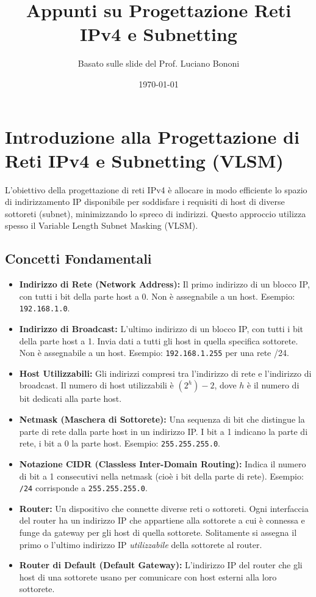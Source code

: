 \documentclass{article}
\title{Appunti su Progettazione Reti IPv4 e Subnetting}
\author{Basato sulle slide del Prof. Luciano Bononi}
\date{\today}
\begin{document}
\maketitle
\tableofcontents
\newpage

\section{Introduzione alla Progettazione di Reti IPv4 e Subnetting (VLSM)}
L'obiettivo della progettazione di reti IPv4 è allocare in modo efficiente lo spazio di indirizzamento IP disponibile per soddisfare i requisiti di host di diverse sottoreti (subnet), minimizzando lo spreco di indirizzi. Questo approccio utilizza spesso il Variable Length Subnet Masking (VLSM).

\subsection{Concetti Fondamentali}
\begin{itemize}
    \item \textbf{Indirizzo di Rete (Network Address):} Il primo indirizzo di un blocco IP, con tutti i bit della parte host a 0. Non è assegnabile a un host. Esempio: \texttt{192.168.1.0}.
    \item \textbf{Indirizzo di Broadcast:} L'ultimo indirizzo di un blocco IP, con tutti i bit della parte host a 1. Invia dati a tutti gli host in quella specifica sottorete. Non è assegnabile a un host. Esempio: \texttt{192.168.1.255} per una rete /24.
    \item \textbf{Host Utilizzabili:} Gli indirizzi compresi tra l'indirizzo di rete e l'indirizzo di broadcast. Il numero di host utilizzabili è $(2^h) - 2$, dove $h$ è il numero di bit dedicati alla parte host.
    \item \textbf{Netmask (Maschera di Sottorete):} Una sequenza di bit che distingue la parte di rete dalla parte host in un indirizzo IP. I bit a 1 indicano la parte di rete, i bit a 0 la parte host. Esempio: \texttt{255.255.255.0}.
    \item \textbf{Notazione CIDR (Classless Inter-Domain Routing):} Indica il numero di bit a 1 consecutivi nella netmask (cioè i bit della parte di rete). Esempio: \texttt{/24} corrisponde a \texttt{255.255.255.0}.
    \item \textbf{Router:} Un dispositivo che connette diverse reti o sottoreti. Ogni interfaccia del router ha un indirizzo IP che appartiene alla sottorete a cui è connessa e funge da gateway per gli host di quella sottorete. Solitamente si assegna il primo o l'ultimo indirizzo IP \textit{utilizzabile} della sottorete al router.
    \item \textbf{Router di Default (Default Gateway):} L'indirizzo IP del router che gli host di una sottorete usano per comunicare con host esterni alla loro sottorete.
\end{itemize}
\end{document}
